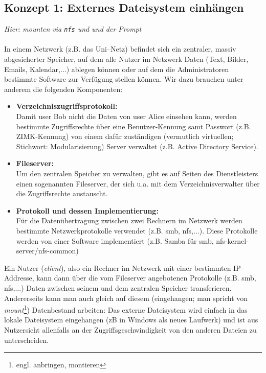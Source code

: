 \subsection{Konzept 1: Externes Dateisystem einhängen}
\textit{Hier: \textit{mounten} via \texttt{nfs} und  und der  Prompt}\\~\\
In einem Netzwerk (z.B. das Uni--Netz) befindet sich ein zentraler, massiv abgesicherter Speicher, auf dem alle Nutzer im Netzwerk Daten (Text, Bilder, Emails, Kalendar,...) ablegen können oder auf dem die Administratoren bestimmte Software zur Verfügung stellen können. Wir dazu brauchen unter anderem die folgenden Komponenten:
\begin{itemize}
	\item \textbf{Verzeichniszugriffsprotokoll:}\\ Damit user Bob nicht die Daten von user Alice einsehen kann, werden bestimmte Zugriffsrechte über eine Benutzer-Kennung samt Passwort (z.B. ZIMK-Kennung) von einem dafür zuständigen (vermutlich virtuellen; Stichwort: Modularisierung) Server verwaltet (z.B. Active Directory Service).
	\item \textbf{Fileserver:}\\ Um den zentralen Speicher zu verwalten, gibt es auf Seiten des Dienstleisters einen sogenannten Fileserver, der sich u.a. mit dem Verzeichnisverwalter über die Zugriffsrechte austauscht.
	\item \textbf{Protokoll und dessen Implementierung:}\\ 
	Für die Datenübertragung zwischen zwei Rechnern im Netzwerk werden bestimmte Netzwerkprotokolle verwendet (z.B. smb, nfs,...). Diese Protokolle werden von einer Software implementiert (z.B. Samba für smb, nfs-kernel-server/nfs-common)
\end{itemize}
Ein Nutzer (\textit{client}), also ein Rechner im Netzwerk mit einer bestimmten IP-Addresse, kann dann über die vom Fileserver angebotenen Protokolle (z.B. smb, nfs,...) Daten zwischen seinem und dem zentralen Speicher transferieren.\\ 
Andererseits kann man auch gleich auf diesem (eingehangen; man spricht von \textit{mount}\footnote{engl. anbringen, montieren}) Datenbestand arbeiten: Das externe Dateisystem wird einfach in das lokale Dateisystem eingehangen (zB in Windows als neues Laufwerk) und ist aus Nutzersicht allenfalls an der Zugriffsgeschwindigkeit von den anderen Dateien zu unterscheiden.~\\
